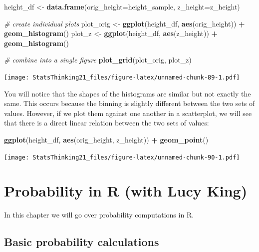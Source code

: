 \documentclass[
  12pt,
]{book}
\newenvironment{Shaded}{\begin{snugshade}}{\end{snugshade}}
\newcommand{\AttributeTok}[1]{\textcolor[rgb]{0.13,0.29,0.53}{#1}}
\newcommand{\CommentTok}[1]{\textcolor[rgb]{0.56,0.35,0.01}{\textit{#1}}}
\newcommand{\FunctionTok}[1]{\textcolor[rgb]{0.13,0.29,0.53}{\textbf{#1}}}
\newcommand{\NormalTok}[1]{#1}
\newcommand{\OtherTok}[1]{\textcolor[rgb]{0.56,0.35,0.01}{#1}}
\newcommand{\SpecialCharTok}[1]{\textcolor[rgb]{0.81,0.36,0.00}{\textbf{#1}}}
\begin{document}
\begin{Shaded}
\begin{Highlighting}[]
\NormalTok{height\_df }\OtherTok{\textless{}{-}} \FunctionTok{data.frame}\NormalTok{(}\AttributeTok{orig\_height=}\NormalTok{height\_sample, }
                        \AttributeTok{z\_height=}\NormalTok{z\_height)}

\CommentTok{\# create individual plots}
\NormalTok{plot\_orig }\OtherTok{\textless{}{-}} \FunctionTok{ggplot}\NormalTok{(height\_df, }\FunctionTok{aes}\NormalTok{(orig\_height)) }\SpecialCharTok{+} 
  \FunctionTok{geom\_histogram}\NormalTok{()}
\NormalTok{plot\_z }\OtherTok{\textless{}{-}} \FunctionTok{ggplot}\NormalTok{(height\_df, }\FunctionTok{aes}\NormalTok{(z\_height)) }\SpecialCharTok{+} 
  \FunctionTok{geom\_histogram}\NormalTok{()}

\CommentTok{\# combine into a single figure}
\FunctionTok{plot\_grid}\NormalTok{(plot\_orig, plot\_z)}
\end{Highlighting}
\end{Shaded}

\texttt{[image: StatsThinking21\_files/figure-latex/unnamed-chunk-89-1.pdf]}

You will notice that the shapes of the histograms are similar but not exactly the same. This occurs because the binning is slightly different between the two sets of values. However, if we plot them against one another in a scatterplot, we will see that there is a direct linear relation between the two sets of values:

\begin{Shaded}
\begin{Highlighting}[]
\FunctionTok{ggplot}\NormalTok{(height\_df, }\FunctionTok{aes}\NormalTok{(orig\_height, z\_height)) }\SpecialCharTok{+} 
  \FunctionTok{geom\_point}\NormalTok{()}
\end{Highlighting}
\end{Shaded}

\texttt{[image: StatsThinking21\_files/figure-latex/unnamed-chunk-90-1.pdf]}

\hypertarget{probability-in-r-with-lucy-king}{%
\chapter{Probability in R (with Lucy King)}\label{probability-in-r-with-lucy-king}}

In this chapter we will go over probability computations in R.

\hypertarget{basic-probability-calculations}{%
\section{Basic probability calculations}\label{basic-probability-calculations}}
\end{document}
